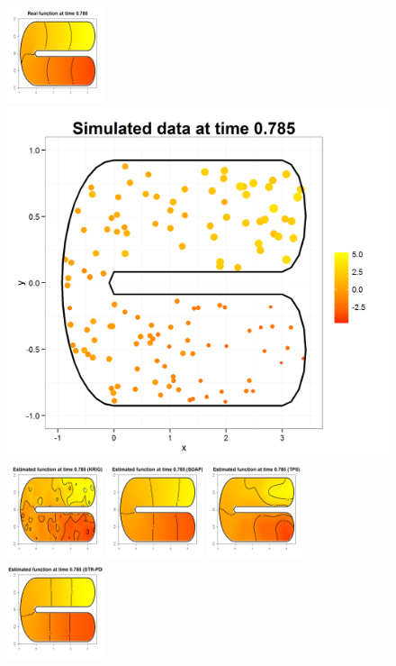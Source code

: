 \documentclass[a4paper,11pt,twoside,openright]{book}							%
\begin{document}
\begin{landscape}
\begin{figure}
\includegraphics[width=0.25\textwidth]{immagini/simulazioni/REALEtempo2.png}
\includegraphics[height=0.25\textwidth]{immagini/simulazioni/Dati_tempo2.png}
\includegraphics[width=0.25\textwidth]{immagini/simulazioni/KRIGtempo2.png}
\includegraphics[width=0.25\textwidth]{immagini/simulazioni/SOAPtempo2.png}
\includegraphics[width=0.25\textwidth]{immagini/simulazioni/TPStempo2.png}
\includegraphics[width=0.25\textwidth]{immagini/simulazioni/STSRtempo2.png}


\end{figure}
\end{landscape}
\end{document}
